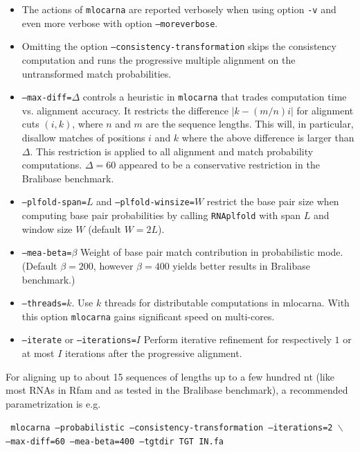 \documentclass{article}
\newenvironment{ttbox}{%
  \begin{framed}\begin{minipage}{1.0\textwidth}\tt}%
{\end{minipage}\end{framed}\noindent}
\begin{document}
\begin{itemize}
\item The actions of \texttt{mlocarna} are reported verbosely when
  using option \texttt{-v} and even more verbose with option
  \texttt{--moreverbose}.
\item Omitting the option \texttt{--consistency-transformation} skips the
consistency computation and runs the progressive multiple alignment on
the untransformed match probabilities.
\item \texttt{--max-diff=$\Delta$} controls a heuristic in
  \texttt{mlocarna} that trades computation time vs. alignment
  accuracy. It restricts the difference $|k-(m/n)i|$ for alignment
  cuts $(i,k)$, where $n$ and $m$ are the sequence lengths.  This
  will, in particular, disallow matches of positions $i$ and $k$ where
  the above difference is larger than $\Delta$. This restriction is
  applied to all alignment and match probability
  computations. $\Delta=60$ appeared to be a conservative restriction
  in the Bralibase benchmark.
\item \texttt{--plfold-span=$L$} and \texttt{--plfold-winsize=$W$}
  restrict the base pair size when computing base pair probabilities
  by calling \texttt{RNAplfold} with span $L$ and window size $W$
  (default $W=2L$).
\item \texttt{--mea-beta=$\beta$} Weight of base pair match
  contribution in probabilistic mode. (Default $\beta=200$,
  however $\beta=400$ yields better results in Bralibase benchmark.)
\item \texttt{--threads=$k$}. Use $k$ threads for distributable
  computations in mlocarna. With this option \texttt{mlocarna} gains
  significant speed on multi-cores.
\item \texttt{--iterate} or \texttt{--iterations=$I$} Perform
  iterative refinement for respectively $1$ or at most $I$ iterations
  after the progressive alignment.
\end{itemize}

For aligning up to about 15 sequences of lengths up to a few hundred nt (like most
RNAs in Rfam and as tested in the Bralibase benchmark), a recommended parametrization is e.g.
\begin{ttbox}
  mlocarna --probabilistic --consistency-transformation --iterations=2 $\backslash$ \\
  \hphantom{mlocarna} --max-diff=60 --mea-beta=400 %
  --tgtdir TGT IN.fa
\end{ttbox}
\end{document}
